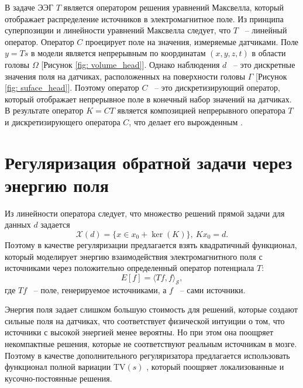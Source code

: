 \documentclass[a4paper,14pt,oneside,openany]{extarticle}
\begin{document}
В задаче ЭЭГ $T$ является оператором решения уравнений Максвелла, который отображает 
распределение источников в электромагнитное поле. Из принципа суперпозиции и 
линейности уравнений Максвелла следует, что $T$ ~-- линейный оператор. 
Оператор $C$ проецирует поле на значения, измеряемые датчиками. 
Поле $y=T s$ в модели является непрерывным по координатам $(x,y,z,t)$ в области головы 
$\Omega$ [Рисунок \ref{fig: volume_head}]. 
Однако наблюдения $d$ ~-- это дискретные значения поля на датчиках, расположенных на 
поверхности головы $\Gamma$ [Рисунок \ref{fig: suface_head}]. 
Поэтому оператор $C$ ~-- это дискретизирующий оператор, который отображает непрерывное 
поле в конечный набор значений на датчиках. В результате оператор $K = C T$ является 
композицией непрерывного оператора $T$ и дискретизирующего оператора $C$, 
что делает его вырожденным \cite{Paraskevopoulou2023}.



\newpage
\section{Регуляризация обратной задачи через энергию поля}

Из линейности оператора следует, что множество решений прямой задачи для данных $d$ задается 
$$\mathcal{X}(d)=\{x \in x_0 + \ker(K)\},~Kx_0=d.$$
Поэтому в качестве регуляризации предлагается взять квадратичный функционал, который 
моделирует энергию взаимодействия электромагнитного поля с источниками через 
положительно определенный оператор потенциала $T$:
\begin{equation}
    E[f] = \langle T f, f \rangle_{\mathcal{S}},
\end{equation}
где $Tf$ ~-- поле, генерируемое источниками, а $f$ ~-- сами источники.

Энергия поля задает слишком большую стоимость для решений, которые 
создают сильные поля на датчиках, что соответствует физической интуиции 
о том, что источники с высокой энергией менее вероятны. Но при этом 
она поощряет некомпактные решения, которые не соответствуют реальным источникам в мозге. 
Поэтому в качестве дополнительного регуляризатора предлагается использовать 
функционал полной вариации $\mathrm{TV}(s)$ \cite{Mokhtari2023}, 
который поощряет локализованные и кусочно-постоянные решения.
\end{document}
